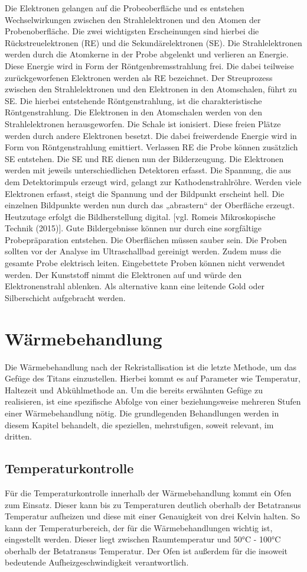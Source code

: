 \documentclass[a4paper, 11pt]{tubsreprt}
\begin{document}
Die Elektronen gelangen auf die Probeoberfläche und es entstehen Wechselwirkungen zwischen den Strahlelektronen und den Atomen der Probenoberfläche. Die zwei wichtigsten Erscheinungen sind hierbei die Rückstreuelektronen (RE) und die Sekundärelektronen (SE). Die Strahlelektronen werden durch die Atomkerne in der Probe abgelenkt  und verlieren an Energie. Diese Energie wird in Form der Röntgenbremsstrahlung frei. Die dabei teilweise zurückgeworfenen Elektronen werden als RE bezeichnet. Der Streuprozess zwischen den Strahlelektronen und den Elektronen in den Atomschalen, führt zu SE. Die hierbei entstehende Röntgenstrahlung, ist die charakteristische Röntgenstrahlung. Die Elektronen in den Atomschalen werden von den Strahlelektronen herausgeworfen. Die Schale ist ionisiert. Diese freien Plätze werden durch andere Elektronen besetzt. Die dabei freiwerdende Energie wird in Form von Röntgenstrahlung emittiert. Verlassen RE die Probe können zusätzlich SE entstehen.
Die SE und RE dienen nun der Bilderzeugung. Die Elektronen werden mit jeweils unterschiedlichen Detektoren erfasst. Die Spannung, die aus dem Detektorimpuls erzeugt wird, gelangt zur Kathodenstrahlröhre. Werden viele Elektronen erfasst, steigt die Spannung und der Bildpunkt erscheint hell. Die einzelnen Bildpunkte werden nun durch das „abrastern“ der Oberfläche erzeugt. Heutzutage erfolgt die Bildherstellung digital. [vgl. Romeis Mikroskopische Technik (2015)].
Gute Bildergebnisse können nur durch eine sorgfältige Probepräparation entstehen. Die Oberflächen müssen sauber sein. Die Proben sollten vor der Analyse im Ultraschallbad gereinigt werden.  Zudem muss die gesamte Probe elektrisch leiten. Eingebettete Proben können nicht verwendet werden. Der Kunststoff nimmt die Elektronen auf und würde den Elektronenstrahl ablenken. Als alternative kann eine leitende Gold oder Silberschicht aufgebracht werden.
\section{Wärmebehandlung}

Die Wärmebehandlung nach der Rekristallisation ist die letzte Methode, um das Gefüge des Titans einzustellen. Hierbei kommt es auf Parameter wie Temperatur, Haltezeit und Abkühlmethode an. Um die bereits erwähnten Gefüge zu realisieren, ist eine spezifische Abfolge von einer beziehungsweise mehreren Stufen einer Wärmebehandlung nötig. Die grundlegenden Behandlungen werden in diesem Kapitel behandelt, die speziellen, mehrstufigen, soweit relevant, im dritten.
\subsection{Temperaturkontrolle}
Für die Temperaturkontrolle innerhalb der Wärmebehandlung kommt ein Ofen zum Einsatz. Dieser kann bis zu Temperaturen deutlich oberhalb der Betatransus Temperatur aufheizen und diese mit einer Genauigkeit von drei Kelvin halten. So kann der Temperaturbereich, der für die Wärmebehandlungen wichtig ist, eingestellt werden. Dieser liegt zwischen Raumtemperatur und 50°C - 100°C oberhalb der Betatransus Temperatur. Der Ofen ist außerdem für die insoweit bedeutende Aufheizgeschwindigkeit verantwortlich.
\end{document}

